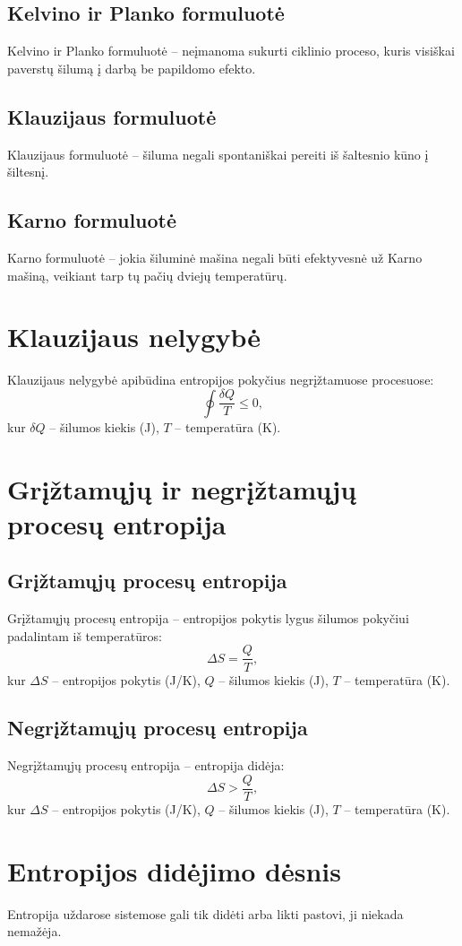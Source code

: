 \documentclass[a4paper,12pt]{article}
\begin{document}
\subsection{Kelvino ir Planko formuluotė}
Kelvino ir Planko formuluotė – neįmanoma sukurti ciklinio proceso, kuris visiškai paverstų šilumą į darbą be papildomo efekto.

\subsection{Klauzijaus formuluotė}
Klauzijaus formuluotė – šiluma negali spontaniškai pereiti iš šaltesnio kūno į šiltesnį.

\subsection{Karno formuluotė}
Karno formuluotė – jokia šiluminė mašina negali būti efektyvesnė už Karno mašiną, veikiant tarp tų pačių dviejų temperatūrų.

\section{Klauzijaus nelygybė}
Klauzijaus nelygybė apibūdina entropijos pokyčius negrįžtamuose procesuose:
\[
\oint \frac{\delta Q}{T} \leq 0,
\]
kur $\delta Q$ – šilumos kiekis (J), $T$ – temperatūra (K).

\section{Grįžtamųjų ir negrįžtamųjų procesų entropija}

\subsection{Grįžtamųjų procesų entropija}
Grįžtamųjų procesų entropija – entropijos pokytis lygus šilumos pokyčiui padalintam iš temperatūros:
\[
\Delta S = \frac{Q}{T},
\]
kur $\Delta S$ – entropijos pokytis (J/K), $Q$ – šilumos kiekis (J), $T$ – temperatūra (K).

\subsection{Negrįžtamųjų procesų entropija}
Negrįžtamųjų procesų entropija – entropija didėja:
\[
\Delta S > \frac{Q}{T},
\]
kur $\Delta S$ – entropijos pokytis (J/K), $Q$ – šilumos kiekis (J), $T$ – temperatūra (K).

\section{Entropijos didėjimo dėsnis}
Entropija uždarose sistemose gali tik didėti arba likti pastovi, ji niekada nemažėja.
\end{document}
